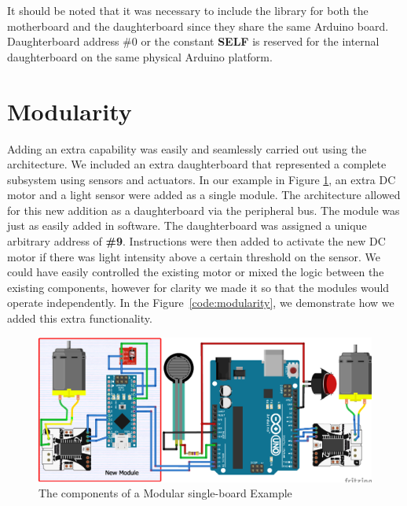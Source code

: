 It should be noted that it was necessary to include the library for both the motherboard and the daughterboard since they share the same Arduino board. Daughterboard address \#0 or the constant \textbf{SELF} is reserved for the internal daughterboard on the same physical Arduino platform.

	\section{Modularity} %
	\label{sec:modularity}
Adding an extra capability was easily and seamlessly carried out using the \xten architecture. We included an extra daughterboard that represented a complete subsystem using sensors and actuators. In our example in Figure \ref{fig:modularity}, an extra DC motor and a light sensor were added as a single module. The \xten architecture allowed for this new addition as a daughterboard via the peripheral bus. The module was just as easily added in software. The daughterboard was assigned a unique arbitrary address of \textbf{\#9}. Instructions were then added to activate the new DC motor if there was light intensity above a certain threshold on the sensor. We could have easily controlled the existing motor or mixed the logic between the existing components, however for clarity we made it so that the modules would operate independently.  In the Figure~\ref{code:modularity}, we demonstrate how we added this extra functionality.

\begin{figure}[h!]
  \begin{center}
    \includegraphics[width=1.0\columnwidth]{Figures/modular-example.pdf}
    \caption{The components of a Modular single-board \xten Example}\label{fig:modularity}
  \end{center}
\end{figure}

